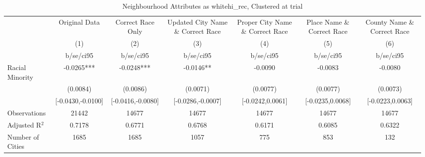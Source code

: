 \documentclass{article}
\begin{document}
\begin{table}[htbp]\centering
\def\sym#1{\ifmmode^{#1}\else\(^{#1}\)\fi}
\caption{Neighbourhood Attributes as whitehi\_rec, Clustered at trial}
\begin{tabular}{l*{6}{c}}
\toprule
                    &\multicolumn{1}{c}{Original Data}&\multicolumn{1}{c}{Correct Race Only}&\multicolumn{1}{c}{Updated City Name \& Correct Race}&\multicolumn{1}{c}{Proper City Name \& Correct Race}&\multicolumn{1}{c}{Place Name \& Correct Race}&\multicolumn{1}{c}{County Name \& Correct Race}\\\cmidrule(lr){2-2}\cmidrule(lr){3-3}\cmidrule(lr){4-4}\cmidrule(lr){5-5}\cmidrule(lr){6-6}\cmidrule(lr){7-7}
                    &\multicolumn{1}{c}{(1)}   &\multicolumn{1}{c}{(2)}   &\multicolumn{1}{c}{(3)}   &\multicolumn{1}{c}{(4)}   &\multicolumn{1}{c}{(5)}   &\multicolumn{1}{c}{(6)}   \\
                    &   b/se/ci95   &   b/se/ci95   &   b/se/ci95   &   b/se/ci95   &   b/se/ci95   &   b/se/ci95   \\
\midrule
Racial Minority     &     -0.0265***&     -0.0248***&     -0.0146** &     -0.0090   &     -0.0083   &     -0.0080   \\
                    &    (0.0084)   &    (0.0086)   &    (0.0071)   &    (0.0077)   &    (0.0077)   &    (0.0073)   \\
                    &[-0.0430,-0.0100]   &[-0.0416,-0.0080]   &[-0.0286,-0.0007]   &[-0.0242,0.0061]   &[-0.0235,0.0068]   &[-0.0223,0.0063]   \\
\midrule
Observations        &       21442   &       14677   &       14677   &       14677   &       14677   &       14677   \\
Adjusted R$^2$      &      0.7178   &      0.6771   &      0.6768   &      0.6171   &      0.6085   &      0.6322   \\
Number of Cities    &        1685   &        1685   &        1057   &         775   &         853   &         132   \\
\bottomrule
\end{tabular}
\end{table}
\end{document}
